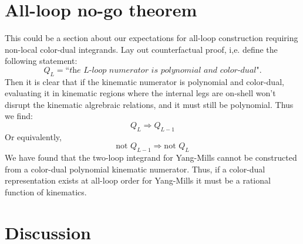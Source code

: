 \documentclass[11pt,letter]{article}
\newcommand{\eg}{e.g.~}
\def\be{\begin{equation}}
\def\ee{\end{equation}}
\begin{document}
\iffalse
We now turn to exploring the use of non-local numerators to skirt the
incompatibility.  We expect that promoting the numerators to
sufficiently complicated rational functions of the momenta will
eventually produce a color-dual representation.  At worst one could
imagine diagram ``numerator'' functions where all possible propagators
of all diagrams appear in each diagram ``numerator's'' denominator, at
which point required contributions could be arbitrarily rearranged
between diagrams.  However, given the success of non-local loop
numerators in other contexts \cite{Square, WeinzierlBCJLagrangian,
  Mogull:2015adi, FivePointN4BCJ, Johansson:2017bfl}, we hope that
only relatively tame additional denominators are required.

As a first attempt at such a non-local representation, we consider
allowing one factor each of $s$,$t$, or $u$ in the denominator of each
of the double-box and penta-triangle numerators, in addition to the
standard local ansatze.  In order to not over-count the local terms,
we restrict the non-local ansatze to only truly rational terms, \eg
for the term $n_{\text{nl}}\sim \frac{x}{s}$ we drop all terms with
$x \propto s$.  Thus each basis diagram ansatz contains 114,422 terms
to start, 10,010 from the local terms and 34,804 from each of the
three non-local pieces.
\fi


\section{All-loop no-go theorem}
This could be a section about our expectations for all-loop construction requiring non-local color-dual integrands. Lay out counterfactual proof, i,e. define the following statement:
\be
 Q_L=\textit{``the $L$-loop numerator is polynomial and color-dual"}. 
\ee
Then it is clear that if the kinematic numerator is polynomial and color-dual, evaluating it in kinematic regions where the internal legs are on-shell won't disrupt the kinematic algrebraic relations, and it must still be polynomial. Thus we find:
\be
Q_L \Rightarrow Q_{L-1}
\ee
Or equivalently,
\be
\text{not }Q_{L-1}\Rightarrow \text{not }Q_L
\ee
We have found that the two-loop integrand for Yang-Mills cannot be constructed from a color-dual polynomial kinematic numerator. Thus, if a color-dual representation exists at all-loop order for Yang-Mills it must be a rational function of kinematics. 
  
\section{Discussion}\label{sec:Discussion}
\end{document}
